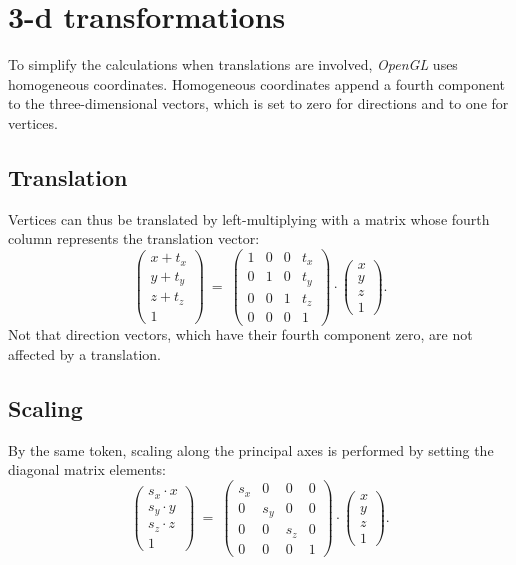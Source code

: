 \section{3-d transformations}

To simplify the calculations when translations are involved, \textit{OpenGL} uses homogeneous coordinates.
Homogeneous coordinates append a fourth component to the three-dimensional vectors, which is set to zero for
directions and to one for vertices.


\subsection{Translation}
Vertices can thus be translated by left-multiplying with a matrix whose fourth column represents the translation
vector:
\begin{equation}
	\left( \begin{array}{c} x + t_x \\ y + t_y \\ z + t_z \\ 1 \end{array} \right) 
	\ =\  
	\left( \begin{array}{cccc} 
		1 & 0 & 0 & t_x \\
		0 & 1 & 0 & t_y \\
		0 & 0 & 1 & t_z \\
		0 & 0 & 0 & 1
	\end{array} \right) \cdot
	\left( \begin{array}{c} x \\ y \\ z \\ 1 \end{array} \right).
\end{equation}
Not that direction vectors, which have their fourth component zero, are not affected by a translation.


\subsection{Scaling}
By the same token, scaling along the principal axes is performed by setting the diagonal matrix elements:
\begin{equation}
	\left( \begin{array}{c} s_x \cdot x \\ s_y \cdot y \\ s_z \cdot z \\ 1 \end{array} \right) 
	\ =\  
	\left( \begin{array}{cccc} 
		s_x & 0 & 0 & 0 \\
		0 & s_y & 0 & 0 \\
		0 & 0 & s_z & 0 \\
		0 & 0 & 0 & 1
	\end{array} \right) \cdot
	\left( \begin{array}{c} x \\ y \\ z \\ 1 \end{array} \right).
\end{equation}


